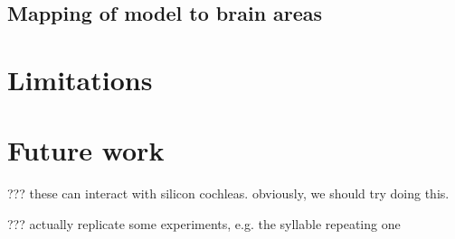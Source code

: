 
\subsection{Mapping of model to brain areas}





\section{Limitations}


\section{Future work}

??? these can interact with silicon cochleas.
obviously, we should try doing this.

??? actually replicate some experiments,
e.g. the syllable repeating one





